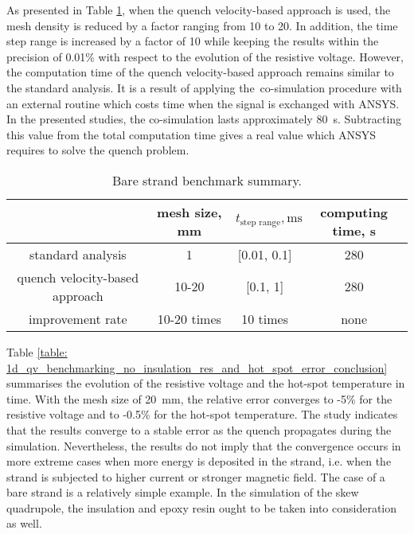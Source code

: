 As presented in Table \ref{table: 1d_qv_benchmarking_no_insulation_methods_comparison}, when the quench velocity-based approach is used, the mesh density is reduced by a factor ranging from 10 to 20. In addition, the time step range is increased by a factor of 10 while keeping the results within the precision of 0.01\% with respect to the evolution of the resistive voltage. However, the computation time of the quench velocity-based approach remains similar to the standard analysis. It is a result of applying the~co-simulation procedure with an external routine which costs time when the signal is exchanged with ANSYS. In the presented studies, the co-simulation lasts approximately 80~s. Subtracting this value from the total computation time gives a real value which ANSYS requires to solve the quench problem. 

\begin{table}[H]
    \caption{Bare strand benchmark summary.} 
    \vspace{-1.em} 
    \fontsize{10}{10}
    \selectfont 
    \renewcommand{\arraystretch}{1.5}
    \begin{center}
        \begin{tabular}{ cccc }  
        \hline
          & mesh size, mm & $t_\text{step range},\text{ms}$ & computing time, s\\
        \hline
        standard analysis & 1 & [0.01, 0.1] & 280 \\
        quench velocity-based approach & 10-20 & [0.1, 1] & 280 \\
        \hline 
        improvement rate & 10-20 times & 10 times & none\\
        \end{tabular}
    \end{center}  
     \label{table: 1d_qv_benchmarking_no_insulation_methods_comparison}
 \end{table}
 
Table \ref{table: 1d_qv_benchmarking_no_insulation_res_and_hot_spot_error_conclusion} summarises the evolution of the resistive voltage and the hot-spot temperature in time. With the mesh size of 20~mm, the relative error converges to -5\% for the resistive voltage and to -0.5\% for the hot-spot temperature. The study indicates that the results converge to a stable error as the quench propagates during the simulation. Nevertheless, the results do not imply that the convergence occurs in more extreme cases when more energy is deposited in the strand, i.e. when the strand is subjected to higher current or stronger magnetic field. The case of a bare strand is a relatively simple example. In the simulation of the skew quadrupole, the insulation and epoxy resin ought to be taken into consideration as well. 
 
